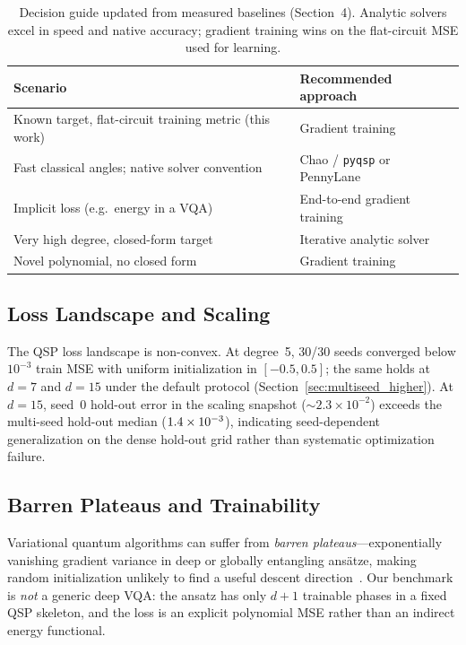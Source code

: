 \documentclass[11pt,a4paper]{article}
\begin{document}
\begin{table}[ht]
\centering\small
\begin{tabularx}{\textwidth}{@{} X l @{}}
  \toprule
  \textbf{Scenario} & \textbf{Recommended approach} \\
  \midrule
  Known target, flat-circuit training metric (this work) & Gradient training \\
  Fast classical angles; native solver convention & Chao / \texttt{pyqsp} or PennyLane \\
  Implicit loss (e.g.\ energy in a VQA) & End-to-end gradient training \\
  Very high degree, closed-form target & Iterative analytic solver~\cite{chao2020finding} \\
  Novel polynomial, no closed form & Gradient training \\
  \bottomrule
\end{tabularx}
\caption{Decision guide updated from measured baselines (Section~4). Analytic solvers excel in speed and native accuracy; gradient training wins on the flat-circuit MSE used for learning.}
\label{tab:decision}
\end{table}

\subsection{Loss Landscape and Scaling}

The QSP loss landscape is non-convex. At degree~5, 30/30 seeds converged below $10^{-3}$ train MSE with uniform initialization in $[-0.5,0.5]$; the same holds at $d=7$ and $d=15$ under the default protocol (Section~\ref{sec:multiseed_higher}). At $d=15$, seed~0 hold-out error in the scaling snapshot ($\sim2.3\times10^{-2}$) exceeds the multi-seed hold-out median ($1.4\times10^{-3}$), indicating seed-dependent generalization on the dense hold-out grid rather than systematic optimization failure.

\subsection{Barren Plateaus and Trainability}
\label{sec:barren}

Variational quantum algorithms can suffer from \emph{barren plateaus}---exponentially vanishing gradient variance in deep or globally entangling ans\"atze, making random initialization unlikely to find a useful descent direction~\cite{mcclean2018barren,cerezo2021variational}. Our benchmark is \emph{not} a generic deep VQA: the ansatz has only $d+1$ trainable phases in a fixed QSP skeleton, and the loss is an explicit polynomial MSE rather than an indirect energy functional.
\end{document}
